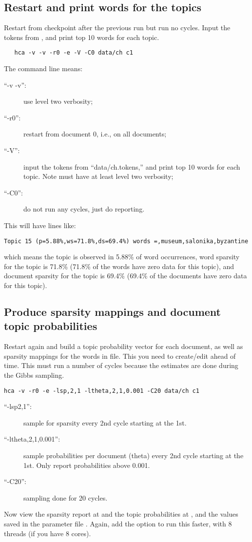 \documentclass[a4paper,english]{article}
\begin{document}
\subsection{Restart and print words for the topics}
Restart from checkpoint after the previous run but run no cycles.
Input the tokens from
, and print top 10 words for each topic.
\begin{verbatim}
   hca -v -v -r0 -e -V -C0 data/ch c1
\end{verbatim}
The command line means:
\begin{description}
\item[``-v -v'':] use level two verbosity;
\item[``-r0'':] restart from document 0, i.e., on all documents;
\item[``-V'':] input the tokens from
``data/ch.tokens,'' and print top 10 words for each topic.
Note must have at least level two verbosity;
\item[``-C0'':] do not run any cycles, just do reporting.
\end{description}
This will have lines like:
\begin{verbatim}
Topic 15 (p=5.88%,ws=71.8%,ds=69.4%) words =,museum,salonika,byzantine
\end{verbatim}
which means the topic is observed in 5.88\% of word occurrences,
word sparsity for the topic is 71.8\%
(71.8\% of the words have zero data for this topic),
and document sparsity for the topic is 69.4\%
(69.4\% of the documents have zero data for this topic).

\subsection{Produce sparsity mappings and document topic probabilities}
Restart again and build a topic probability vector for each document,
as well as sparsity mappings for the words in 
 file.
This you need to create/edit ahead of time.
This must run a number of cycles because the estimates are done 
during the Gibbs sampling.
\begin{verbatim}
hca -v -r0 -e -lsp,2,1 -ltheta,2,1,0.001 -C20 data/ch c1
\end{verbatim} 
\begin{description}
\item[``-lsp2,1'':] sample for sparsity every 2nd cycle
starting at the 1st.
\item[``-ltheta,2,1,0.001'':] sample probabilities per document
(theta) every 2nd cycle
starting at the 1st.
Only report probabilities above 0.001.
\item[``-C20'':] sampling done for 20 cycles.
\end{description}
Now view the sparsity report at  and
the topic probabilities at ,
and the values saved in the parameter file .
Again, add the  option to run this faster,
with 8 threads (if you have 8 cores).
\end{document}
